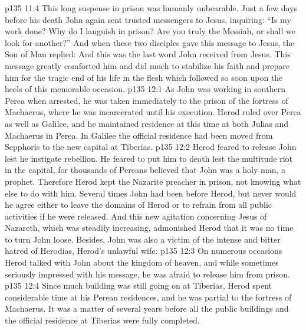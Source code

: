 \vs p135 11:4 \pc This long suspense in prison was humanly unbearable. Just a few days before his death John again sent trusted messengers to Jesus, inquiring: “Is my work done? Why do I languish in prison? Are you truly the Messiah, or shall we look for another?” And when these two disciples gave this message to Jesus, the Son of Man replied:  And this was the last word John received from Jesus. This message greatly comforted him and did much to stabilize his faith and prepare him for the tragic end of his life in the flesh which followed so soon upon the heels of this memorable occasion.
\vs p135 12:1 As John was working in southern Perea when arrested, he was taken immediately to the prison of the fortress of Machaerus, where he was incarcerated until his execution. Herod ruled over Perea as well as Galilee, and he maintained residence at this time at both Julias and Machaerus in Perea. In Galilee the official residence had been moved from Sepphoris to the new capital at Tiberias.
\vs p135 12:2 Herod feared to release John lest he instigate rebellion. He feared to put him to death lest the multitude riot in the capital, for thousands of Pereans believed that John was a holy man, a prophet. Therefore Herod kept the Nazarite preacher in prison, not knowing what else to do with him. Several times John had been before Herod, but never would he agree either to leave the domains of Herod or to refrain from all public activities if he were released. And this new agitation concerning Jesus of Nazareth, which was steadily increasing, admonished Herod that it was no time to turn John loose. Besides, John was also a victim of the intense and bitter hatred of Herodias, Herod’s unlawful wife.
\vs p135 12:3 On numerous occasions Herod talked with John about the kingdom of heaven, and while sometimes seriously impressed with his message, he was afraid to release him from prison.
\vs p135 12:4 Since much building was still going on at Tiberias, Herod spent considerable time at his Perean residences, and he was partial to the fortress of Machaerus. It was a matter of several years before all the public buildings and the official residence at Tiberias were fully completed.
